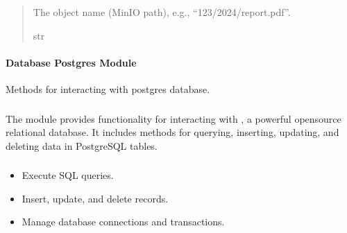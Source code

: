 \documentclass[letterpaper,10pt,english]{sphinxmanual}
\begin{document}
\begin{fulllineitems}
\begin{fulllineitems}
\begin{quote}
\begin{description}
\begin{itemize}
\end{itemize}

\sphinxAtStartPar
The object name (MinIO path), e.g., “123/2024/report.pdf”.

\sphinxAtStartPar
str

\end{description}\end{quote}

\end{fulllineitems}


\end{fulllineitems}



\paragraph{Database Postgres Module}
\label{\detokenize{src.database:module-src.database.postgres}}\label{\detokenize{src.database:database-postgres-module}}
\sphinxAtStartPar
Methods for interacting with postgres database.
\subsubsection*{}

\sphinxAtStartPar
The  module provides functionality for interacting with , a powerful open\sphinxhyphen{}source relational database. It includes methods for querying, inserting, updating, and deleting data in PostgreSQL tables.
\subsubsection*{}
\begin{itemize}
\item {} 
\sphinxAtStartPar
Execute SQL queries.

\item {} 
\sphinxAtStartPar
Insert, update, and delete records.

\item {} 
\sphinxAtStartPar
Manage database connections and transactions.

\end{itemize}
\end{document}
